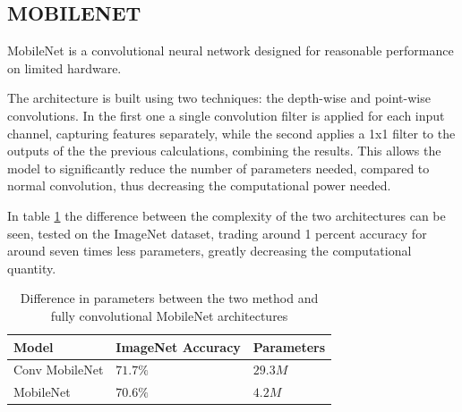 \subsection{MOBILENET}
\label{subsec:relatedsec2subsec3}
\par MobileNet is a convolutional neural network designed for reasonable performance on limited hardware.
\par The architecture is built using two techniques: the depth-wise and point-wise convolutions. In the first one a single convolution filter is applied for each input channel, capturing features separately, while the second applies a 1x1 filter to the outputs of the the previous calculations, combining the results. This allows the model to significantly reduce the number of parameters needed, compared to normal convolution, thus decreasing the computational power needed. \cite{howard2017mobilenets}
\par In table \ref{MobileNetTable} the difference between the complexity of the two architectures can be seen, tested on the ImageNet dataset, trading around 1 percent accuracy for around seven times less parameters, greatly decreasing the computational quantity.

\begin{table}[htbp]
\begin{center}
\begin{tabular}
{|p{120pt}|p{120pt}|p{120pt}|}
\hline
Model & ImageNet Accuracy & Parameters\\
\hline 
\hline Conv MobileNet & $71.7\%$ & $29.3M$ \\
\hline MobileNet & $70.6\%$ & $4.2M$ \\
\hline
\end{tabular}
\end{center}
\caption{Difference in parameters between the two method and fully convolutional MobileNet architectures \cite{howard2017mobilenets}}
\label{MobileNetTable}
\end{table}